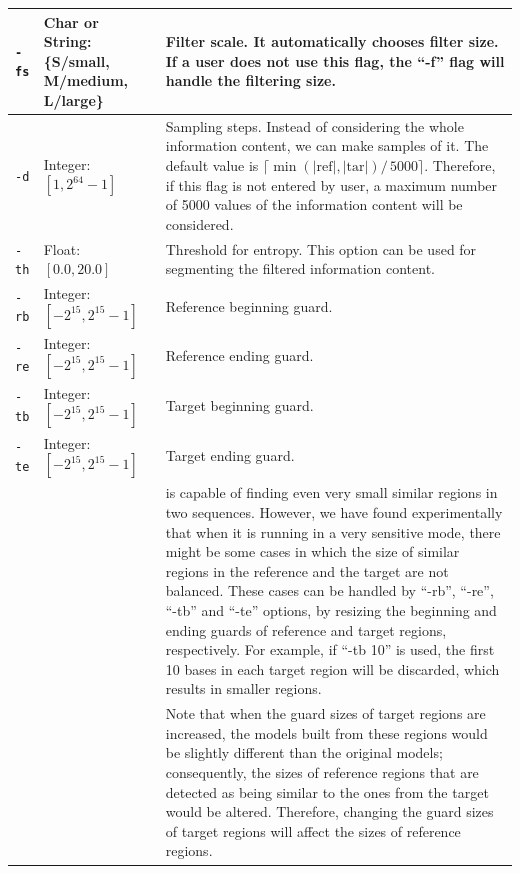 \documentclass[a4paper,9pt]{extarticle}
\newcommand*{\mono}[1]{\lstinline|#1|}
\newcommand*{\method}[1]{\text{#1}\xspace}
\newcommand*{\smashpp}   {\method{Smash++}}
\begin{document}
\begin{small}
\begin{tabularx}{\linewidth}{@{}lp{2.9cm}X@{}}
  \midrule
  \mono{-fs} & Char or String:\newline \{S/small, M/medium, L/large\}
   & Filter scale. It automatically chooses filter size. If a user does not use this flag, the ``-f'' flag will handle the filtering size.  \\
  \midrule
  \mono{-d} & Integer: $[1, 2^{64}-1]$ & Sampling steps. Instead of considering the whole information content, we can make samples of it. The default value is $\lceil\min\left(\lvert\textrm{ref}\rvert, \lvert\textrm{tar}\rvert\right) /\, 5000\rceil$. Therefore, if this flag is not entered by user, a maximum number of 5000 values of the information content will be considered. \\
  \midrule
  \mono{-th} & Float: $[0.0, 20.0]$\newline {}{1.5} & Threshold for entropy. This option can be used for segmenting the filtered information content. \\
  \midrule
  \mono{-rb} & Integer: $[-2^{15}, 2^{15}-1]$ & Reference beginning guard. \\
  \mono{-re} & Integer: $[-2^{15}, 2^{15}-1]$ & Reference ending guard. \\
  \mono{-tb} & Integer: $[-2^{15}, 2^{15}-1]$ & Target beginning guard. \\
  \mono{-te} & Integer: $[-2^{15}, 2^{15}-1]$ & Target ending guard. \\
  & {0} & \smashpp is capable of finding even very small similar regions in two sequences. However, we have found experimentally that when it is running in a very sensitive mode, there might be some cases in which the size of similar regions in the reference and the target are not balanced. These cases can be handled by ``-rb'', ``-re'', ``-tb'' and ``-te'' options, by resizing the beginning and ending guards of reference and target regions, respectively. For example, if ``-tb 10'' is used, the first 10 bases in each target region will be discarded, which results in smaller regions.\linebreak \\ 
  & & Note that when the guard sizes of target regions are increased, the models built from these regions would be slightly different than the original models; consequently, the sizes of reference regions that are detected as being similar to the ones from the target would be altered. Therefore, changing the guard sizes of target regions will affect the sizes of reference regions. 

\end{tabularx}
\end{small}
\end{document}
